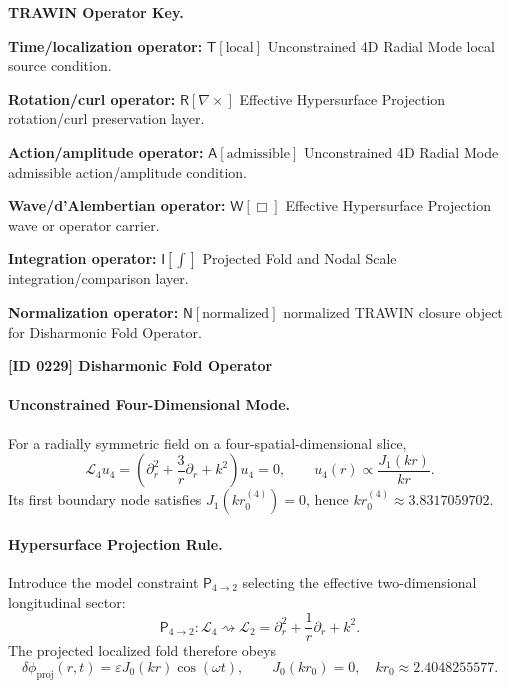 \par\vspace{0.45\baselineskip}
\noindent\begin{minipage}[t]{\linewidth}
\begingroup
\small
\raggedright
\textbf{TRAWIN Operator Key.}\par
\noindent\textbf{Time/localization operator:} $\mathsf{T}\!\left[\mathrm{local}\right]$ Unconstrained 4D Radial Mode local source condition.\par
\noindent\textbf{Rotation/curl operator:} $\mathsf{R}\!\left[\nabla\times\right]$ Effective Hypersurface Projection rotation/curl preservation layer.\par
\noindent\textbf{Action/amplitude operator:} $\mathsf{A}\!\left[\mathrm{admissible}\right]$ Unconstrained 4D Radial Mode admissible action/amplitude condition.\par
\noindent\textbf{Wave/d'Alembertian operator:} $\mathsf{W}\!\left[\Box\right]$ Effective Hypersurface Projection wave or operator carrier.\par
\noindent\textbf{Integration operator:} $\mathsf{I}\!\left[\int\right]$ Projected Fold and Nodal Scale integration/comparison layer.\par
\noindent\textbf{Normalization operator:} $\mathsf{N}\!\left[\mathrm{normalized}\right]$ normalized TRAWIN closure object for Disharmonic Fold Operator.\par
\endgroup
\end{minipage}

\clearpage
\noindent\textbf{[ID 0229] Disharmonic Fold Operator}\par
\vspace{0.35em}
\paragraph{Unconstrained Four-Dimensional Mode.}
For a radially symmetric field on a four-spatial-dimensional slice,
\[
\mathcal{L}_4u_4=\left(\partial_r^2+\frac{3}{r}\partial_r+k^2\right)u_4=0,\qquad u_4(r)\propto\frac{J_1(k r)}{k r}.
\]
Its first boundary node satisfies \(J_1(k r^{(4)}_0)=0\), hence \(k r^{(4)}_0\approx3.8317059702\).
\paragraph{Hypersurface Projection Rule.}
Introduce the model constraint \(\mathsf{P}_{4\to2}\) selecting the effective two-dimensional longitudinal sector:
\[
\mathsf{P}_{4\to2}:\mathcal{L}_4\rightsquigarrow\mathcal{L}_2=\partial_r^2+\frac{1}{r}\partial_r+k^2.
\]
The projected localized fold therefore obeys
\[
\delta\phi_{\mathrm{proj}}(r,t)=\varepsilon J_0(k r)\cos(\omega t),\qquad J_0(k r_0)=0,\quad k r_0\approx2.4048255577.
\]
